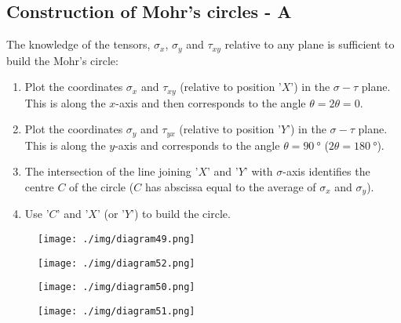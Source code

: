 \subsection{Construction of Mohr's circles - A}
The knowledge of the tensors, $\sigma_x$, $\sigma_y$ and $\tau_{xy}$ relative to any plane is sufficient to build the Mohr's circle:
\begin{enumerate}
  \item Plot the coordinates $\sigma_x$ and $\tau_{xy}$ (relative to position '$X$') in the $\sigma - \tau$ plane. This is along the $x$-axis and then corresponds to the angle $\theta = 2\theta = 0$.
  \item Plot the coordinates $\sigma_y$ and $\tau_{yx}$ (relative to position '$Y$') in the $\sigma - \tau$ plane. This is along the $y$-axis and corresponds to the angle $\theta = \SI{90}{\degree}$ ($2\theta = \SI{180}{\degree}$).
  \item The intersection of the line joining '$X$' and '$Y$' with $\sigma$-axis identifies the centre $C$ of the circle ($C$ has abscissa equal to the average of $\sigma_x$ and $\sigma_y$).
  \item Use '$C$' and '$X$' (or '$Y$') to build the circle.
\end{enumerate}
\begin{figure}[H]
  \begin{minipage}{0.25\textwidth}
    \centering
    \texttt{[image: ./img/diagram49.png]}
  \end{minipage}
  \begin{minipage}{0.25\textwidth}
    \centering
    \texttt{[image: ./img/diagram52.png]}
  \end{minipage}
  \begin{minipage}{0.25\textwidth}
    \centering
    \texttt{[image: ./img/diagram50.png]}
  \end{minipage}
  \begin{minipage}{0.23\textwidth}
    \centering
    \texttt{[image: ./img/diagram51.png]}
  \end{minipage}
  \caption{}
\end{figure}
